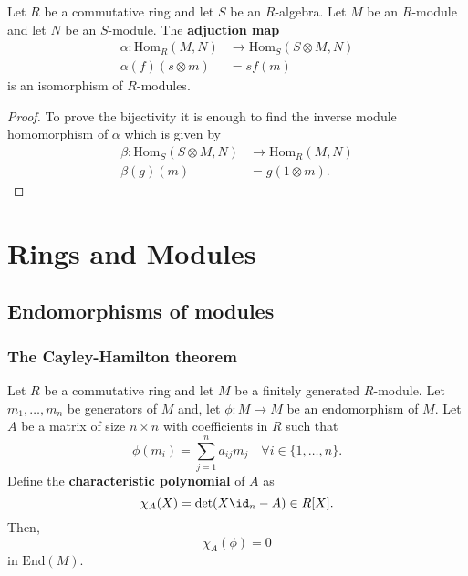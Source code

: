 \documentclass[12pt, a4paper]{article}
\begin{document}
\begin{proposition}
    Let \(R\) be a commutative ring and let \(S\) be an \(R\)-algebra. Let \(M\) be an \(R\)-module and let \(N\) be an \(S\)-module. The \textbf{adjuction map}
    \[\begin{aligned}
        \alpha :\text{Hom}_R(M,N) &\to \text{Hom}_S(S\otimes M,N) \\
        \alpha(f)(s\otimes m) &=sf(m)
    \end{aligned}\]
    is an isomorphism of \(R\)-modules.
\end{proposition}

\begin{proof}
    To prove the bijectivity it is enough to find the inverse module homomorphism of \(\alpha\) which is given by 
    \[\begin{aligned}
        \beta:\text{Hom}_S(S\otimes M,N) &\to \text{Hom}_R(M,N) \\
        \beta(g)(m) &=g(1\otimes m).
    \end{aligned}\]
\end{proof}

\section{Rings and Modules}

\subsection{Endomorphisms of modules}

\subsubsection{The Cayley-Hamilton theorem}

\begin{mdthm}
    Let \(R\) be a commutative ring and let \(M\) be a finitely generated \(R\)-module. Let \(m_1,\ldots,m_n\) be generators of \(M\) and, let \(\phi:M \to M\) be an endomorphism of \(M\). Let \(A\) be a matrix of size \(n \times n\) with coefficients in \(R\) such that 
    \[\phi(m_i)=\sum_{j=1}^n a_{ij} m_j \quad \forall i \in \{1,\ldots,n\}.\]
    Define the \textbf{characteristic polynomial} of \(A\) as 
    \[\chi_A(X)=\det(X \id_n-A) \in R[X].\]
    Then, 
    \[\chi_A(\phi)=0\]
    in \(\text{End}(M)\).
\end{mdthm}
\end{document}
